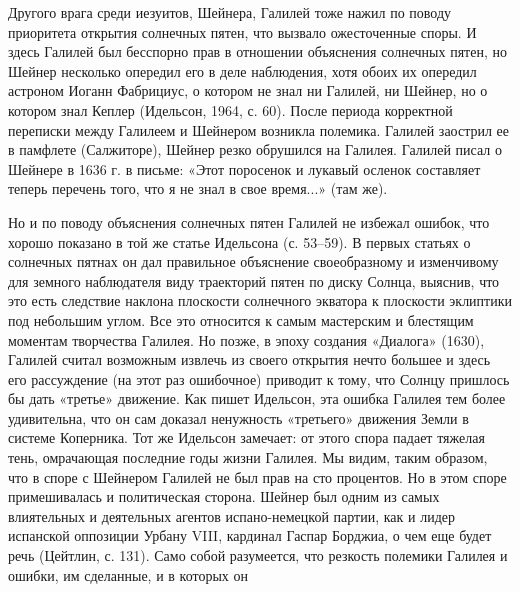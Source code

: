 Другого врага среди иезуитов, Шейнера, Галилей тоже нажил по поводу приоритета
открытия солнечных пятен, что вызвало ожесточенные споры. И здесь Галилей был
бесспорно прав в отношении объяснения солнечных пятен, но Шейнер несколько
опередил его в деле наблюдения, хотя обоих их опередил астроном Иоганн
Фабрициус, о котором не знал ни Галилей, ни Шейнер, но о котором знал Кеплер
(Идельсон, 1964, с. 60). После периода корректной переписки между Галилеем и
Шейнером возникла полемика. Галилей заострил ее в памфлете (Салжиторе), Шейнер
резко обрушился на Галилея. Галилей писал о Шейнере в 1636 г. в письме: «Этот
поросенок и лукавый осленок составляет теперь перечень того, что я не знал в
свое время...» (там же).

Но и по поводу объяснения солнечных пятен Галилей не избежал ошибок,
что хорошо показано в той же статье Идельсона (с. 53--59). В первых
статьях о солнечных пятнах он дал правильное объяснение своеобразному
и изменчивому для земного наблюдателя виду траекторий пятен по диску
Солнца, выяснив, что это есть следствие наклона плоскости солнечного
экватора к плоскости эклиптики под небольшим углом. Все это относится
к самым мастерским и блестящим моментам творчества Галилея. Но
позже, в эпоху создания «Диалога» (1630), Галилей считал возможным
извлечь из своего открытия нечто большее и здесь его рассуждение (на
этот раз ошибочное) приводит к тому, что Солнцу пришлось бы дать
«третье» движение. Как пишет Идельсон, эта ошибка Галилея тем более
удивительна, что он сам доказал ненужность «третьего» движения Земли в
системе Коперника. Тот же Идельсон замечает: от этого спора падает
тяжелая тень, омрачающая последние годы жизни Галилея. Мы видим, таким
образом, что в споре с Шейнером Галилей не был прав на сто процентов.
Но в этом споре примешивалась и политическая сторона. Шейнер был одним
из самых влиятельных и деятельных агентов испано-немецкой партии, как
и лидер испанской оппозиции Урбану VIII, кардинал Гаспар Борджиа, о
чем еще будет речь (Цейтлин, с. 131). Само собой разумеется, что
резкость полемики Галилея и ошибки, им сделанные, и в которых он
